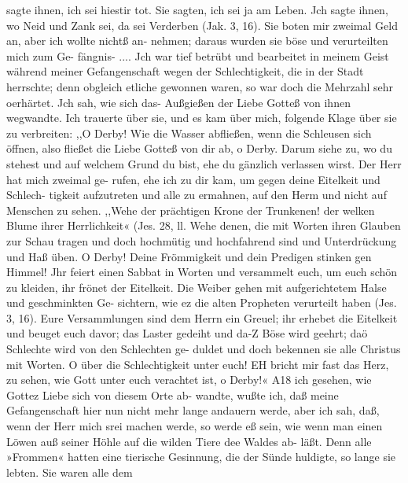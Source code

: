 sagte ihnen, ich sei hiestir tot. Sie sagten, ich sei ja am Leben.
Jch sagte ihnen, wo Neid und Zank sei, da sei Verderben (Jak. 3, 16).
Sie boten mir zweimal Geld an, aber ich wollte nichtß an-
nehmen; daraus wurden sie böse und verurteilten mich zum Ge-
fängnis- ....
Jch war tief betrübt und bearbeitet in meinem Geist während
meiner Gefangenschaft wegen der Schlechtigkeit, die in der Stadt
herrschte; denn obgleich etliche gewonnen waren, so war doch die
Mehrzahl sehr oerhärtet. Jch sah, wie sich das- Außgießen der
Liebe Gotteß von ihnen wegwandte. Ich trauerte über sie, und
es kam über mich, folgende Klage über sie zu verbreiten:
,,O Derby! Wie die Wasser abfließen, wenn die Schleusen
sich öffnen, also fließet die Liebe Gotteß von dir ab, o Derby.
Darum siehe zu, wo du stehest und auf welchem Grund du bist,
ehe du gänzlich verlassen wirst. Der Herr hat mich zweimal ge-
rufen, ehe ich zu dir kam, um gegen deine Eitelkeit und Schlech-
tigkeit aufzutreten und alle zu ermahnen, auf den Herm und
nicht auf Menschen zu sehen. ,,Wehe der prächtigen Krone der
Trunkenen! der welken Blume ihrer Herrlichkeit« (Jes. 28, ll.
Wehe denen, die mit Worten ihren Glauben zur Schau tragen und
doch hochmütig und hochfahrend sind und Unterdrückung und Haß
üben. O Derby! Deine Frömmigkeit und dein Predigen stinken
gen Himmel! Jhr feiert einen Sabbat in Worten und versammelt
euch, um euch schön zu kleiden, ihr frönet der Eitelkeit. Die
Weiber gehen mit aufgerichtetem Halse und geschminkten Ge-
sichtern, wie ez die alten Propheten verurteilt haben (Jes. 3, 16).
Eure Versammlungen sind dem Herrn ein Greuel; ihr erhebet
die Eitelkeit und beuget euch davor; das Laster gedeiht und da-Z
Böse wird geehrt; daö Schlechte wird von den Schlechten ge-
duldet und doch bekennen sie alle Christus mit Worten. O über
die Schlechtigkeit unter euch! EH bricht mir fast das Herz, zu
sehen, wie Gott unter euch verachtet ist, o Derby!«
A18 ich gesehen, wie Gottez Liebe sich von diesem Orte ab-
wandte, wußte ich, daß meine Gefangenschaft hier nun nicht mehr
lange andauern werde, aber ich sah, daß, wenn der Herr mich
srei machen werde, so werde eß sein, wie wenn man einen
Löwen auß seiner Höhle auf die wilden Tiere dee Waldes ab-
läßt. Denn alle »Frommen« hatten eine tierische Gesinnung, die
der Sünde huldigte, so lange sie lebten. Sie waren alle dem


